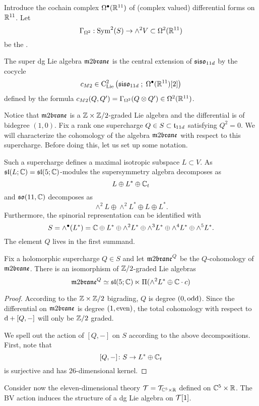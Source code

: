 \documentclass[11pt]{amsart}
\begin{document}
Introduce the cochain complex $\Omega^{\bullet}(\mathbb R^{11})$ of (complex valued) differential forms on $\mathbb R^{11}$. 
Let
\[
  \Gamma_{\Omega^2} : \operatorname{Sym}^2(S) \to \wedge^2 V \subset \Omega^2(\mathbb R^{11}) 
\]
be the . 

\begin{dfn}
  The super dg Lie algebra $\m2$ is the central extension of $\mathfrak{siso}_{11d}$ by the cocycle
  \[
    c_{M2} \in {\rm C}_{{\rm Lie}}^2\left(\mathfrak{siso}_{11d} \; ; \; \Omega^\bullet (\mathbb R^{11})[2]\right)
  \]
  defined by the formula $c_{M2} (Q, Q') = \Gamma_{\Omega^2}(Q \otimes Q') \in \Omega^2(\mathbb R^{11})$.
\end{dfn}

Notice that $\m2$ is a $\mathbb Z \times \mathbb Z/2$-graded Lie algebra and the differential is of bidegree $(1,0)$.
Fix a rank one supercharge $Q \in S \subset \mathfrak t_{11d}$ satisfying $Q^2 = 0$. 
We will characterize the cohomology of the algebra $\m2$ with respect to this supercharge. 
Before doing this, let us set up some notation. 

Such a supercharge defines a maximal isotropic subspace $L \subset V$. 
As $\mathfrak{sl}(L ; \mathbb C) = \mathfrak{sl}(5 ; \mathbb C)$-modules the supersymmetry algebra decomposes as
\[
L \oplus L^* \oplus \mathbb C_t
\]
and $\mathfrak{so}(11, \mathbb C)$ decomposes as
\[
\wedge^2 L \oplus \wedge^2 L^* \oplus L \oplus L^* .
\]
Furthermore, the spinorial representation can be identified with
\[
S = \wedge^\bullet (L^*) = \mathbb C \oplus L^* \oplus \wedge^2 L^* \oplus \wedge^3 L^* \oplus \wedge^4 L^* \oplus \wedge^5 L^* .
\]
The element $Q$ lives in the first summand.

\begin{lem}
Fix a holomorphic supercharge $Q \in S$ and let $\m2^Q$ be the $Q$-cohomology of $\m2$.
There is an isomorphism of $\mathbb Z/2$-graded Lie algebras
  \[
    \m2^Q \simeq \fsl(5;\CC) \ltimes \Pi (\wedge^2 L^* \oplus \CC\cdot c)
  \]
\end{lem}
\begin{proof}
According to the $\mathbb Z \times \mathbb Z/2$ bigrading, $Q$ is degree $(0,{\rm odd})$.
Since the differential on $\m2$ is degree $(1,{\rm even})$, the total cohomology with respect to ${\rm d} + [Q,-]$ will only be $\mathbb Z/2$ graded. 
 
We spell out the action of $[Q,-]$ on $S$ according to the above decompositions.
First, note that
\[
[Q,-] \colon S \to L^* \oplus \mathbb C_t
\]
is surjective and has $26$-dimensional kernel. 
\end{proof}


Consider now the eleven-dimensional theory $\mathcal T = \mathcal T_{\mathbb C^5 \times \mathbb R}$ defined on $\mathbb C^5 \times \mathbb R$. 
The BV action induces the structure of a dg Lie algebra on $\mathcal T[1]$. 
\end{document}
